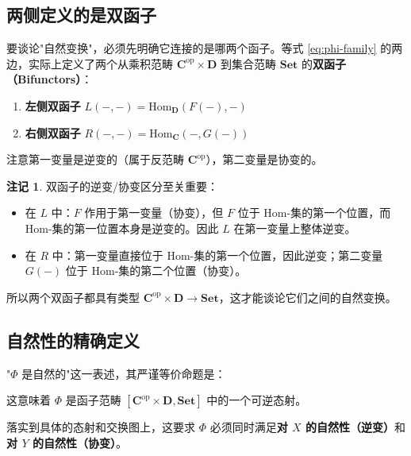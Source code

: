 \documentclass[12pt,a4paper]{ctexart}
\theoremstyle{definition}
\newtheorem{remark}[definition]{注记}
\newcommand{\cat}[1]{\mathbf{#1}}
\newcommand{\Set}{\cat{Set}}
\newcommand{\Hom}{\mathrm{Hom}}
\begin{document}
\subsection{两侧定义的是双函子}

要谈论"自然变换"，必须先明确它连接的是哪两个函子。等式 \eqref{eq:phi-family} 的两边，实际上定义了两个从乘积范畴 $\cat{C}^{\mathrm{op}} \times \cat{D}$ 到集合范畴 $\Set$ 的\textbf{双函子（Bifunctors）}：

\begin{enumerate}[label=(\arabic*),nosep]
    \item \textbf{左侧双函子} $L(-, -) = \Hom_{\cat{D}}(F(-), -)$
    \item \textbf{右侧双函子} $R(-, -) = \Hom_{\cat{C}}(-, G(-))$
\end{enumerate}

注意第一变量是逆变的（属于反范畴 $\cat{C}^{\mathrm{op}}$），第二变量是协变的。

\begin{remark}
双函子的逆变/协变区分至关重要：
\begin{itemize}[nosep]
    \item 在 $L$ 中：$F$ 作用于第一变量（协变），但 $F$ 位于 Hom-集的第一个位置，而 Hom-集的第一位置本身是逆变的。因此 $L$ 在第一变量上整体逆变。
    \item 在 $R$ 中：第一变量直接位于 Hom-集的第一个位置，因此逆变；第二变量 $G(-)$ 位于 Hom-集的第二个位置（协变）。
\end{itemize}
所以两个双函子都具有类型 $\cat{C}^{\mathrm{op}} \times \cat{D} \to \Set$，这才能谈论它们之间的自然变换。
\end{remark}

\subsection{自然性的精确定义}

"$\Phi$ 是自然的"这一表述，其严谨等价命题是：

\begin{center}
\end{center}

这意味着 $\Phi$ 是函子范畴 $[\cat{C}^{\mathrm{op}} \times \cat{D}, \Set]$ 中的一个可逆态射。

落实到具体的态射和交换图上，这要求 $\Phi$ 必须同时满足\textbf{对 $X$ 的自然性（逆变）}和\textbf{对 $Y$ 的自然性（协变）}。

\newpage
\end{document}
